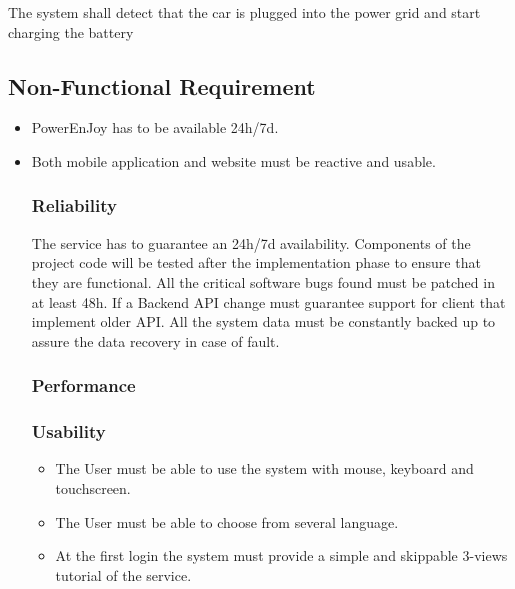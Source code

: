 \subsubsection{}
\begin{itemize}
	\reqcounter The system shall detect that the car is plugged into the power grid and start charging the battery

\end{itemize}

\subsection{Non-Functional Requirement}



\begin{itemize}
	\item PowerEnJoy has to be available 24h/7d.
	\item Both mobile application and website must be reactive and usable.
	
\subsubsection{Reliability}%

The service has to guarantee an 24h/7d availability. Components of the project code will be tested after the implementation phase to ensure that they are functional. 
All the critical software bugs found must be patched in at least 48h.
If a Backend API change must guarantee support for client that implement older API.
All the system data must be constantly backed up to assure the data recovery in case of fault.


\subsubsection{Performance}

\subsubsection{Usability}
\begin{itemize}
	\item The User must be able to use the system with mouse, keyboard and touchscreen.
	\item The User must be able to choose from several language.
	\item At the first login the system must provide a simple and skippable 3-views tutorial of the service.
\end{itemize}


\end{itemize}

